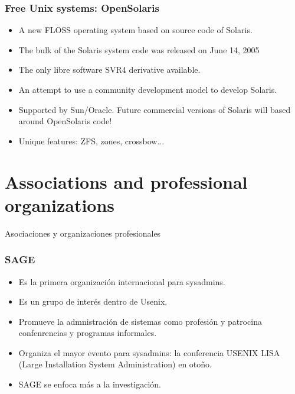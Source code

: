 \documentclass{beamer}
\begin{document}
\begin{frame}
\frametitle{Free Unix systems: OpenSolaris}

\begin{itemize}
\item A new FLOSS operating system based on source code of Solaris. 
\item The bulk of the Solaris system code was released on June 14, 2005
\item The only libre software SVR4 derivative available.
\item An attempt to use a community development model to develop Solaris.
\item Supported by Sun/Oracle. Future commercial versions of Solaris will based around OpenSolaris code!
\item Unique features: ZFS, zones, crossbow...
\end{itemize}
\end{frame}

\section{Associations and professional organizations}

\begin{frame}

\begin{center}
\huge{Asociaciones y organizaciones profesionales}
\end{center}

\end{frame}


\begin{frame}
\frametitle{SAGE}

\begin{itemize}
\item Es la primera organización internacional para sysadmins.
\item Es un grupo de interés dentro de Usenix.
\item Promueve la admnistración de sistemas como profesión y patrocina confenrencias y programas informales.
\item Organiza el mayor evento para sysadmins: la conferencia USENIX LISA (Large Installation System Administration) en otoño.
\item SAGE se enfoca más a la investigación.
\end{itemize}
\end{frame}
\end{document}

